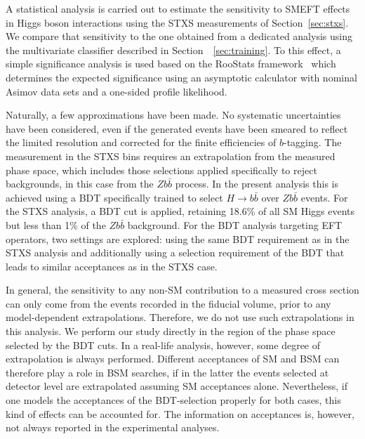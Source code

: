 A statistical analysis is carried out to estimate the sensitivity to SMEFT effects in Higgs boson interactions using the STXS measurements of Section~\ref{sec:stxs}.
We compare that sensitivity to the one obtained from a dedicated analysis using the multivariate classifier described in Section~~\ref{sec:training}. To this effect, a simple significance analysis is used based on the {\sc RooStats} framework~\cite{Moneta:2010pm} which determines the expected significance using an asymptotic calculator with nominal Asimov data sets and a one-sided profile likelihood. 

Naturally, a few approximations have been made. No systematic uncertainties have been considered, even if the generated events have been smeared to reflect the limited resolution and corrected for the finite efficiencies of $b$-tagging. The measurement in the STXS bins requires an extrapolation from the measured phase space, which includes those selections applied specifically to reject backgrounds, in this case from the $Z b\bar{b}$ process. In the present analysis this is achieved using a BDT specifically trained to select $H\to b\bar{b}$ over $Z b\bar{b}$ events. For the STXS analysis, a BDT cut is applied, retaining 18.6\% of all SM Higgs events but less than 1\% of the $Z b\bar{b}$ background. For the BDT analysis targeting EFT operators, two settings are explored: using the same BDT requirement as in the STXS analysis and additionally using a selection requirement of the BDT that leads to similar acceptances as in the STXS case. 

In general, the sensitivity to any
 non-SM contribution to a measured cross section can only come from the events recorded
 in the fiducial volume, prior to any model-dependent extrapolations.
 Therefore, we do not use such extrapolations in this analysis. We perform our study 
 directly in the region of the phase space selected by the BDT cuts.
 In a real-life analysis, however, some degree of extrapolation is always performed. 
 Different acceptances of SM and BSM can therefore play a role in BSM searches, if in the latter the events selected at detector level are extrapolated assuming SM acceptances alone. Nevertheless, if one models the acceptances of the BDT-selection properly for both cases, this kind of effects can be accounted for.
The information on acceptances is, however, not always reported in the experimental analyses.
 
